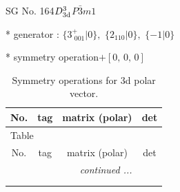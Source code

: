 \documentclass[fleqn,8pt]{jsarticle}
\begin{document}
\setcounter{MaxMatrixCols}{32}

\renewcommand{\tablename}{Table~}
\renewcommand{\figurename}{Figure~}
\begin{center}
\LARGE
SG No. 164\quad$D_{\rm 3d}^{3}$\quad$P\bar{3}m1$\quad[ trigonal ]
\end{center}

* generator : $\{3^{+}_{\,\,001}|0\},\,\,\{2{}_{110}|0\},\,\,\{-1|0\}$

* symmetry operation\quad$+\left[ 0,\, 0,\, 0 \right]$
\renewcommand{\arraystretch}{1.3}
\begin{longtable}{cccc}
\caption{Symmetry operations for 3d polar vector.}
 \\
 \hline \hline
No. & tag & matrix (polar) & det \\ \hline \endfirsthead

\multicolumn{3}{l}{\tablename\ \thetable{}} \\
 \hline \hline
No. & tag & matrix (polar) & det \\ \hline \endhead

 \hline \hline
\multicolumn{3}{r}{\footnotesize\it continued ...} \\ \endfoot

 \hline \hline
\multicolumn{3}{r}{} \\ \endlastfoot


\end{longtable}
\end{document}

